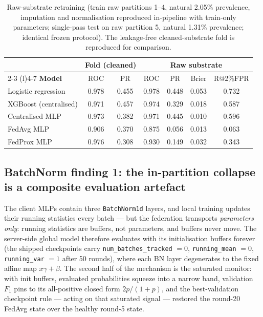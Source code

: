 \begin{table}[t]
\centering
\caption{Raw-substrate retraining (train raw partitions 1--4,
natural 2.05\% prevalence, imputation and normalisation reproduced
in-pipeline with train-only parameters; single-pass test on raw
partition 5, natural 1.31\% prevalence; identical frozen protocol).
The leakage-free cleaned-substrate fold is reproduced for
comparison.}
\label{tab:rawsubstr}
\small
\begin{tabular}{@{}l c c c c c c@{}}
\toprule
 & \multicolumn{2}{c}{\textbf{Fold (cleaned)}} &
 \multicolumn{4}{c}{\textbf{Raw substrate}} \\
\cmidrule(r){2-3} \cmidrule(l){4-7}
\textbf{Model} & ROC & PR & ROC & PR & Brier & R@2\%FPR \\
\midrule
Logistic regression & 0.978 & 0.455 & 0.978 & 0.448 & 0.053 & 0.732 \\
XGBoost (centralised) & 0.971 & 0.457 & 0.974 & 0.329 & 0.018 & 0.587 \\
Centralised MLP & 0.973 & 0.382 & 0.971 & 0.445 & 0.010 & 0.596 \\
FedAvg MLP & 0.906 & 0.370 & 0.875 & 0.056 & 0.013 & 0.063 \\
FedProx MLP & 0.976 & 0.308 & 0.930 & 0.149 & 0.032 & 0.343 \\
\bottomrule
\end{tabular}
\end{table}

\subsection{BatchNorm finding 1: the in-partition collapse is a
composite evaluation artefact}

The client MLPs contain three \texttt{BatchNorm1d} layers, and local
training updates their running statistics every batch --- but the
federation transports \emph{parameters only}: running statistics are
buffers, not parameters, and buffers never move. The server-side
global model therefore evaluates with its initialisation buffers
forever (the shipped checkpoints carry \texttt{num\_batches\_tracked}
$=0$, \texttt{running\_mean} $=0$, \texttt{running\_var} $=1$ after
50 rounds), where each BN layer degenerates to the fixed affine map
$x\gamma+\beta$. The second half of the mechanism is the saturated
monitor: with init buffers, evaluated probabilities squeeze into a
narrow band, validation $F_1$ pins to its all-positive closed form
$2p/(1+p)$, and the best-validation checkpoint rule --- acting on
that saturated signal --- restored the round-20 FedAvg state over the
healthy round-5 state.

